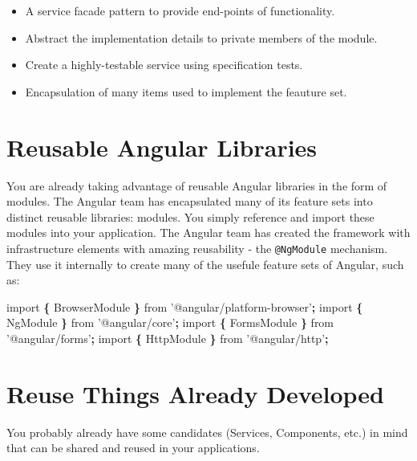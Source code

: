 \documentclass[]{book}
\newenvironment{Shaded}{\begin{snugshade}}{\end{snugshade}}
\newcommand{\StringTok}[1]{\textcolor[rgb]{0.31,0.60,0.02}{#1}}
\newcommand{\ImportTok}[1]{#1}
\newcommand{\OperatorTok}[1]{\textcolor[rgb]{0.81,0.36,0.00}{\textbf{#1}}}
\newcommand{\NormalTok}[1]{#1}
\providecommand{\tightlist}{%
  \setlength{\itemsep}{0pt}\setlength{\parskip}{0pt}}
\theoremstyle{definition}
\theoremstyle{definition}
\theoremstyle{definition}
\theoremstyle{remark}
\begin{document}
\begin{itemize}
\tightlist
\item
  A service facade pattern to provide end-points of functionality.
\item
  Abstract the implementation details to private members of the module.
\item
  Create a highly-testable service using specification tests.
\item
  Encapsulation of many items used to implement the feauture set.
\end{itemize}

\section{Reusable Angular Libraries}\label{reusable-angular-libraries}

You are already taking advantage of reusable Angular libraries in the
form of modules. The Angular team has encapsulated many of its feature
sets into distinct reusable libraries: modules. You simply reference and
import these modules into your application. The Angular team has created
the framework with infrastructure elements with amazing reusability -
the \texttt{@NgModule} mechanism. They use it internally to create many
of the usefule feature sets of Angular, such as:

\begin{Shaded}
\begin{Highlighting}[]
\ImportTok{import} \OperatorTok{\{}\NormalTok{ BrowserModule }\OperatorTok{\}} \ImportTok{from} \StringTok{'@angular/platform-browser'}\OperatorTok{;}
\ImportTok{import} \OperatorTok{\{}\NormalTok{ NgModule }\OperatorTok{\}} \ImportTok{from} \StringTok{'@angular/core'}\OperatorTok{;}
\ImportTok{import} \OperatorTok{\{}\NormalTok{ FormsModule }\OperatorTok{\}} \ImportTok{from} \StringTok{'@angular/forms'}\OperatorTok{;}
\ImportTok{import} \OperatorTok{\{}\NormalTok{ HttpModule }\OperatorTok{\}} \ImportTok{from} \StringTok{'@angular/http'}\OperatorTok{;}
\end{Highlighting}
\end{Shaded}

\section{Reuse Things Already
Developed}\label{reuse-things-already-developed}

You probably already have some candidates (Services, Components, etc.)
in mind that can be shared and reused in your applications.
\end{document}
